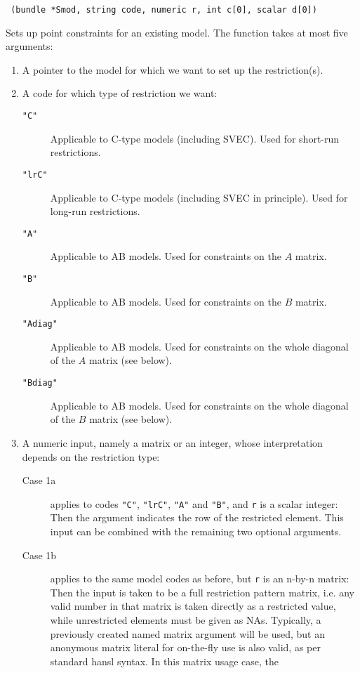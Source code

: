 \documentclass[a4paper,10pt]{article}
\newenvironment{funcdoc}[1]
{\noindent\hrulefill\newline\nopagebreak\texttt{#1}%
\nopagebreak\par\noindent\hrulefill%
\nopagebreak\par\nopagebreak\smallskip\nopagebreak\par}
{\bigskip}
\newcounter{script}[section]
\begin{document}
\begin{funcdoc}{ (bundle *Smod, string code,
    numeric r, int c[0], scalar d[0])}
  \noindent Sets up point constraints for an existing model. The function
  takes at most five arguments:
\begin{enumerate}
\item A pointer to the model for which we want to set up the
  restriction(s).
\item A code for which type of restriction we want: 
  \begin{description}
  \item[\texttt{"C"}] Applicable to C-type models (including SVEC). Used for short-run
    restrictions.
  \item[\texttt{"lrC"}] Applicable to C-type models (including SVEC in principle). 
    Used for long-run restrictions.
  \item[\texttt{"A"}] Applicable to AB models. Used for constraints on
    the $A$ matrix.
  \item[\texttt{"B"}] Applicable to AB models. Used for constraints on
    the $B$ matrix.
  \item[\texttt{"Adiag"}] Applicable to AB models. Used for constraints on
    the whole diagonal of the $A$ matrix (see below).
  \item[\texttt{"Bdiag"}] Applicable to AB models. Used for constraints on
    the whole diagonal of the $B$ matrix (see below).
  \end{description}
\item A numeric input, namely a matrix or an integer, whose interpretation depends
 on the restriction type:
  \begin{description}
  \item[Case 1a] applies to codes \texttt{"C"}, \texttt{"lrC"},
    \texttt{"A"} and \texttt{"B"}, and \texttt{r} is a scalar integer: Then the
    argument indicates the row of the restricted element. This input can be combined
    with the remaining two optional arguments.
  \item[Case 1b] applies to the same model codes as before, but \texttt{r} is an
    n-by-n matrix: Then the input is taken to be a full restriction pattern matrix,
    i.e. any valid number in that matrix is taken directly as a restricted value, 
    while unrestricted elements must be given as NAs. Typically, a previously created
    named matrix argument will be used, but an anonymous matrix literal for on-the-fly
    use is also valid, as per standard hansl syntax. In this matrix usage case, the 

\end{description}
\end{enumerate}
\end{funcdoc}
\end{document}
